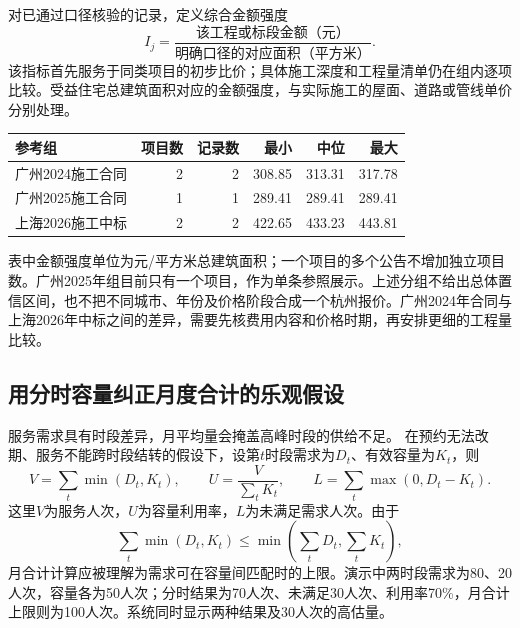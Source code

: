 对已通过口径核验的记录，定义综合金额强度
\begin{equation}
 I_j=\frac{\text{该工程或标段金额（元）}}{\text{明确口径的对应面积（平方米）}}.
\end{equation}
该指标首先服务于同类项目的初步比价；具体施工深度和工程量清单仍在组内逐项比较。受益住宅总建筑面积对应的金额强度，与实际施工的屋面、道路或管线单价分别处理。

\begin{center}\small
\begin{tabular}{@{}L{37mm}rrrrr@{}}
\toprule 参考组 & 项目数 & 记录数 & 最小 & 中位 & 最大\\\midrule

广州2024施工合同 & 2 & 2 & 308.85 & 313.31 & 317.78\\
广州2025施工合同 & 1 & 1 & 289.41 & 289.41 & 289.41\\
上海2026施工中标 & 2 & 2 & 422.65 & 433.23 & 443.81\\

\bottomrule\end{tabular}\end{center}
表中金额强度单位为元/平方米总建筑面积；一个项目的多个公告不增加独立项目数。广州2025年组目前只有一个项目，作为单条参照展示。上述分组不给出总体置信区间，也不把不同城市、年份及价格阶段合成一个杭州报价。广州2024年合同与上海2026年中标之间的差异，需要先核费用内容和价格时期，再安排更细的工程量比较。\cite{gzyouth,gzhong,shcang,shsea}

\subsection{用分时容量纠正月度合计的乐观假设}

服务需求具有时段差异，月平均量会掩盖高峰时段的供给不足。\cite{green2007} 在预约无法改期、服务不能跨时段结转的假设下，设第$t$时段需求为$D_t$、有效容量为$K_t$，则
\begin{equation}
 V=\sum_t\min(D_t,K_t),\qquad
 U=\frac{V}{\sum_tK_t},\qquad
 L=\sum_t\max(0,D_t-K_t).
\end{equation}
这里$V$为服务人次，$U$为容量利用率，$L$为未满足需求人次。由于
\begin{equation}
 \sum_t\min(D_t,K_t)\leq\min\!\left(\sum_tD_t,\sum_tK_t\right),
\end{equation}
月合计计算应被理解为需求可在容量间匹配时的上限。演示中两时段需求为80、20人次，容量各为50人次；分时结果为70人次、未满足30人次、利用率70\%，月合计上限则为100人次。系统同时显示两种结果及30人次的高估量。

